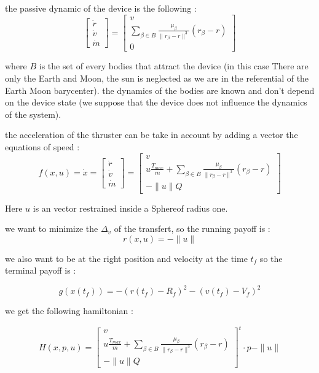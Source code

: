 \documentclass[11pt]{article} %
\begin{document}
			the passive dynamic of the device is the following : 
			$$
			\begin{bmatrix}
				\dot{r}\\
				\dot{v}\\
				\dot{m}
			\end{bmatrix} =\begin{bmatrix}
				v\\
				\sum\limits _{\beta \in B }\frac{\mu _{\beta }}{\| r_{\beta } -r\| ^{3}}( r_{\beta } -r)\\
				0
			\end{bmatrix}
			$$
			
			where $B$ is the set of every bodies that attract the device (in this case There are only the Earth and Moon, the sun is neglected as we are in the referential of the Earth Moon barycenter). the dynamics of the bodies are known and don't depend on the device state (we suppose that the device does not influence the dynamics of the system).
			
			the acceleration of the thruster can be take in account by adding a vector the equations of speed : \\
			
			$$
			f(x,u)=\dot{x}=
			\begin{bmatrix}
				\dot{r}\\
				\dot{v}\\
				\dot{m}
			\end{bmatrix}
			=\begin{bmatrix}
				v\\
				u\frac{T_ {max}}{m}+\sum\limits _{\beta \in B }\frac{\mu _{\beta }}{\| r_{\beta } -r\| ^{3}}( r_{\beta } -r)\\
				-\|u\|Q
			\end{bmatrix}
			$$
			
			Here $u$ is an vector restrained inside a Sphereof radius one. 
			
			we want to minimize the $\Delta_v$ of the transfert, so the running payoff is :
			$$
			r(x,u)=-\|u\|
			$$ 
			
			we also want to be at the right position and velocity at the time $t_f$ so the terminal payoff is :
			
			$$
			g(x(t_f))=-(r(t_f)-R_f)^2-(v(t_f)-V_f)^2
			$$
			
			we get the following hamiltonian :
			
			$$
			H(x,p,u)=\begin{bmatrix}
				v\\
				u\frac{T_ {max}}{m}+\sum\limits _{\beta \in B }\frac{\mu _{\beta }}{\| r_{\beta } -r\| ^{3}}( r_{\beta } -r)\\
				-\|u\|Q
			\end{bmatrix}^t\cdot p-\|u\|
			$$
			
\end{document}
